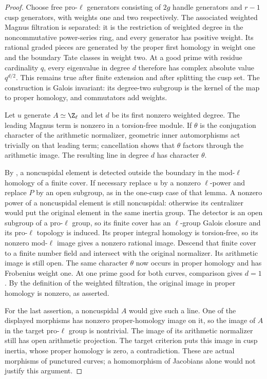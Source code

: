 \begin{proof}
Choose free pro-$\ell$ generators consisting of $2g$ handle generators
and $r-1$ cusp generators, with weights one and two respectively.
The associated weighted Magnus filtration is separated: it is the
restriction of weighted degree in the noncommutative power-series ring,
and every generator has positive weight. Its rational graded pieces
are generated by the proper first homology in weight one and the
boundary Tate classes in weight two. At a good prime with residue
cardinality $q$, every eigenvalue in degree $d$ therefore has complex
absolute value $q^{d/2}$. This remains true after finite extension and
after splitting the cusp set. The construction is Galois invariant:
its degree-two subgroup is the kernel of the map to proper homology,
and commutators add weights.

Let $u$ generate $A\simeq\Z_\ell$ and let $d$ be its first nonzero
weighted degree. The leading Magnus term is nonzero in a torsion-free
module. If $\theta$ is the conjugation character of the arithmetic
normalizer, geometric inner automorphisms act trivially on that leading
term; cancellation shows that $\theta$ factors through the arithmetic
image. The resulting line in degree $d$ has character $\theta$.

By \citet[Lemma 2.1.4]{Nakamura1994}, a noncuspidal element is detected
outside the boundary in the mod-$\ell$ homology of a finite cover.
If necessary replace $u$ by a nonzero $\ell$-power and replace $P$ by
an open subgroup, as in the one-cusp case of that lemma. A nonzero
power of a noncuspidal element is still noncuspidal: otherwise its
centralizer would put the original element in the same inertia group.
The detector is an open subgroup of a pro-$\ell$ group, so its
finite cover has an $\ell$-group Galois closure and its pro-$\ell$
topology is induced. Its proper integral homology is torsion-free, so its
nonzero mod-$\ell$ image gives a nonzero rational image. Descend that
finite cover to a finite number field and intersect with the original
normalizer. Its arithmetic image is still open. The same character
$\theta$ now occurs in proper homology and has Frobenius weight one.
At one prime good for both curves, comparison gives $d=1$. By the
definition of the weighted filtration, the original image in proper
homology is nonzero, as asserted.

For the last assertion, a noncuspidal $A$ would give such a line.
One of the displayed morphisms has nonzero proper-homology image on
it, so the image of $A$ in the target pro-$\ell$ group is nontrivial.
The image of its arithmetic normalizer still has open arithmetic
projection. The target criterion puts this image in cusp inertia,
whose proper homology is zero, a contradiction. These are actual
morphisms of punctured curves; a homomorphism of Jacobians alone
would not justify this argument.
\end{proof}

